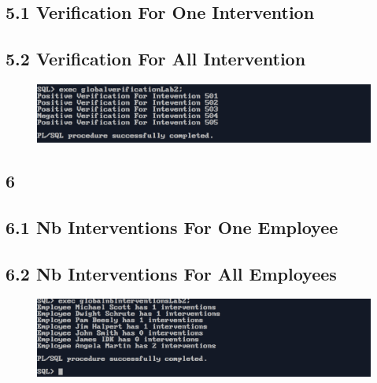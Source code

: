 \subsection*{5.1 Verification For One Intervention}



\newpage
\subsection*{5.2 Verification For All Intervention}



\vspace{0.25cm}
\begin{figure}[ht]
    \centering
    \includegraphics[width=\textwidth]{SQL/examples/PLSQL/EX1/PNG/ex5.png}
\end{figure}

\newpage

\subsection*{6}

\subsection*{6.1 Nb Interventions For One Employee}




\subsection*{6.2 Nb Interventions For All Employees}



\newpage
\begin{figure}[ht]
    \centering
    \includegraphics[width=\textwidth]{SQL/examples/PLSQL/EX1/PNG/ex6.png}
\end{figure}

